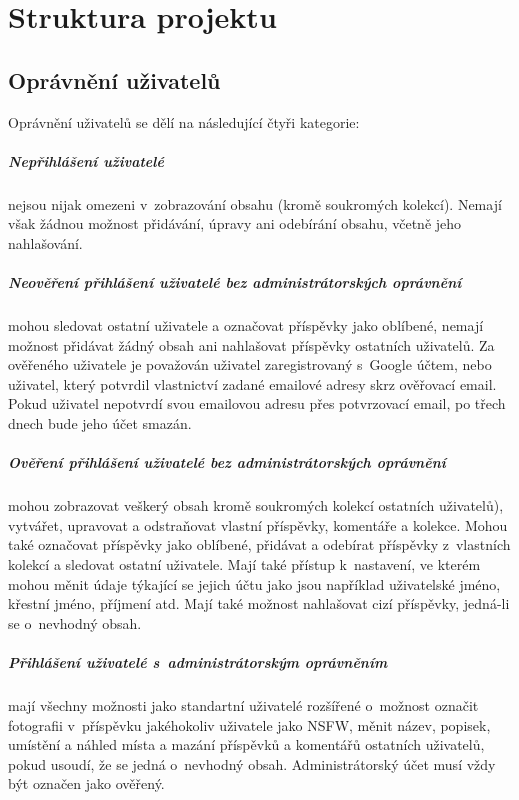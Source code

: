\documentclass[12pt, a4paper,
  oneside,      %
]{report}
\begin{document}
\chapter{Struktura projektu}
\section{Oprávnění uživatelů}
Oprávnění uživatelů se dělí na následující čtyři kategorie:
\paragraph{Nepřihlášení uživatelé} nejsou nijak omezeni v~zobrazování obsahu (kromě soukromých kolekcí). Nemají však žádnou možnost přidávání, úpravy ani odebírání obsahu, včetně jeho nahlašování.
\paragraph{Neověření přihlášení uživatelé bez administrátorských oprávnění} mohou sledovat ostatní uživatele a označovat příspěvky jako oblíbené, nemají možnost přidávat žádný obsah ani nahlašovat příspěvky ostatních uživatelů. Za ověřeného uživatele je považován uživatel zaregistrovaný s~Google účtem, nebo uživatel, který potvrdil vlastnictví zadané emailové adresy skrz ověřovací email. Pokud uživatel nepotvrdí svou emailovou adresu přes potvrzovací email, po třech dnech bude jeho účet smazán.
\paragraph{Ověření přihlášení uživatelé bez administrátorských oprávnění}\label{paragraph:verifiedUser} mohou zobrazovat veškerý obsah kromě soukromých kolekcí ostatních uživatelů), vytvářet, upravovat a odstraňovat vlastní příspěvky, komentáře a kolekce. Mohou také označovat příspěvky jako oblíbené, přidávat a odebírat příspěvky z~vlastních kolekcí a sledovat ostatní uživatele. Mají také přístup k~nastavení, ve kterém mohou měnit údaje týkající se jejich účtu jako jsou například uživatelské jméno, křestní jméno, příjmení atd. Mají také možnost nahlašovat cizí příspěvky, jedná-li se o~nevhodný obsah.
\paragraph{Přihlášení uživatelé s~administrátorským oprávněním}\label{paragraph:usersWithAdminPermissions} mají všechny možnosti jako standartní uživatelé rozšířené o~možnost označit fotografii v~příspěvku jakéhokoliv uživatele jako NSFW, měnit název, popisek, umístění a náhled místa a mazání příspěvků a komentářů ostatních uživatelů, pokud usoudí, že se jedná o~nevhodný obsah. Administrátorský účet musí vždy být označen jako ověřený.
\end{document}
